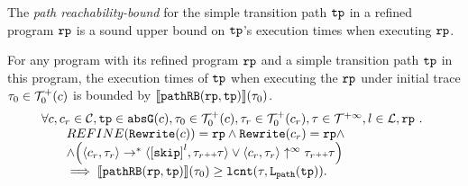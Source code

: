 The \emph{path reachability-bound} for the simple transition path $\mathtt{tp}$ in a refined program $\mathtt{rp}$ is a sound upper bound on $\mathtt{tp}$'s execution times when executing $\mathtt{rp}$.
\begin{lem}
  \label{lem:pathrb-sound}
  For any program with its refined program $\mathtt{rp}$ and a simple transition path $\mathtt{tp}$ in this program,
  the execution times of $\mathtt{tp}$ when executing the $\mathtt{rp}$ under initial trace $\mathtt{\tau}_0 \in \mathcal{T}^{+}_0(c)$ is bounded by $\llbracket \mathtt{pathRB}(\mathtt{rp}, \mathtt{tp}) \rrbracket(\mathtt{\tau}_0)$.
  \[
    \begin{array}{l}
    \forall c, c_r \in \cdom, \tpath \in \absG(c), \trace_0 \in \ftdom_0(c),  \trace_r \in \ftdom_0(c_r), \trace \in \tdom, l \in \ldom, \rprog \st 
    \\ \qquad
    REFINE(\algrewrite(c)) = \rprog
    \land 
    \algrewrite(c_r) = \rprog
    \land
    \\ \qquad
    \land 
    \Big(
      \config{c_r, \trace_r} \rightarrow^* \config{\clabel{\eskip}^{l}, \trace_r \tracecat \trace}
      \lor \config{c_r, \trace_r} \uparrow^{\infty} \trace_r \tracecat \trace 
      \Big)
  \\ \qquad
    \implies
    \econfig{\inoutB(\rprog, \tpath)}(\trace_0) \geq \lcounter(\trace, \pathl(\tpath)).
    \end{array}
  \]  
\end{lem}
%



